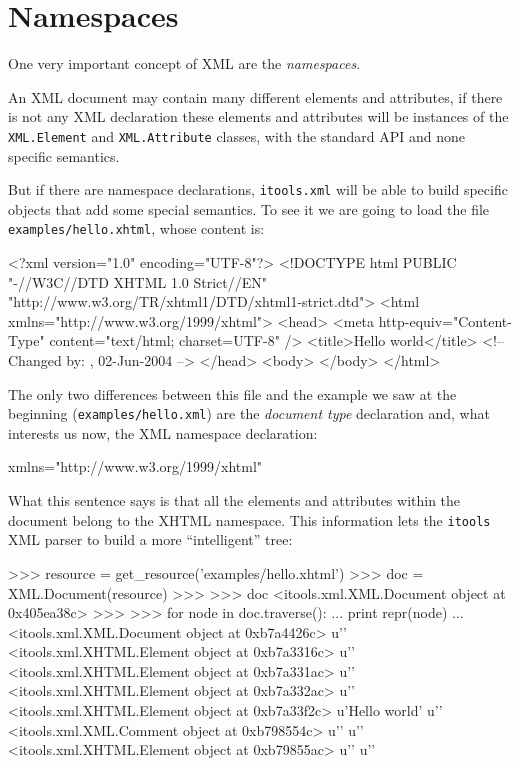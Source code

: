\section{Namespaces}

One very important concept of XML are the {\em namespaces}.

An XML document may contain many different elements and attributes, if there
is not any XML declaration these elements and attributes will be instances
of the {\tt XML.Element} and {\tt XML.Attribute} classes, with the standard
API and none specific semantics.

But if there are namespace declarations, {\tt itools.xml} will be able to
build specific objects that add some special semantics. To see it we are
going to load the file {\tt examples/hello.xhtml}, whose content is:

\begin{code}
    <?xml version="1.0" encoding="UTF-8"?>
    <!DOCTYPE html PUBLIC "-//W3C//DTD XHTML 1.0 Strict//EN"
           "http://www.w3.org/TR/xhtml1/DTD/xhtml1-strict.dtd">
    <html xmlns="http://www.w3.org/1999/xhtml">
      <head>
        <meta http-equiv="Content-Type" content="text/html; charset=UTF-8" />
        <title>Hello world</title>
        <!-- Changed by: , 02-Jun-2004 -->
      </head>
      <body>
      </body>
    </html>
\end{code}

The only two differences between this file and the example we saw at the
beginning ({\tt examples/hello.xml}) are the {\em document type} declaration
and, what interests us now, the XML namespace declaration:

\begin{code}
    xmlns="http://www.w3.org/1999/xhtml"
\end{code}

What this sentence says is that all the elements and attributes within the
document belong to the XHTML namespace. This information lets the {\tt itools}
XML parser to build a more ``intelligent'' tree:

\begin{code}
    >>> resource = get_resource('examples/hello.xhtml')
    >>> doc = XML.Document(resource)
    >>> 
    >>> doc
    <itools.xml.XML.Document object at 0x405ea38c>
    >>> 
    >>> for node in doc.traverse():
    ...     print repr(node)
    ... 
    <itools.xml.XML.Document object at 0xb7a4426c>
    u'\n\n'
    <itools.xml.XHTML.Element object at 0xb7a3316c>
    u'\n  '
    <itools.xml.XHTML.Element object at 0xb7a331ac>
    u'\n    '
    <itools.xml.XHTML.Element object at 0xb7a332ac>
    u'\n    '
    <itools.xml.XHTML.Element object at 0xb7a33f2c>
    u'Hello world'
    u'\n    '
    <itools.xml.XML.Comment object at 0xb798554c>
    u'\n  '
    u'\n  '
    <itools.xml.XHTML.Element object at 0xb79855ac>
    u'\n  '
    u'\n'
\end{code}

